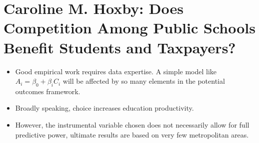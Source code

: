 \documentclass[10pt]{extarticle}
\begin{document}
  \section{Caroline M. Hoxby: Does Competition Among Public Schools Benefit Students and Taxpayers?}%
  \begin{itemize}
    \item Good empirical work requires data expertise. A simple model like $A_i = \beta_0 + \beta_iC_i$ will be affected by so many elements in the potential outcomes framework.
    \item Broadly speaking, choice increases education productivity.
    \item However, the instrumental variable chosen does not necessarily allow for full predictive power, ultimate results are based on very few metropolitan areas.
  \end{itemize}
\end{document}
